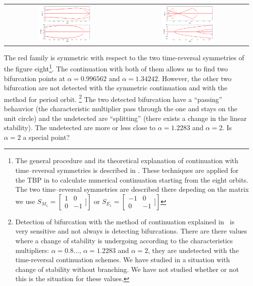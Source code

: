 \documentclass{article}
\begin{document}
\begin{tabular}{cc}
\includegraphics[width=0.45\textwidth]{cm_down.pdf}&
\includegraphics[width=0.45\textwidth]{cm_up.pdf}
\end{tabular}

The red family is symmetric with respect to the two time-reversal
symmetries of the figure eight\footnote{The general procedure and its
  theoretical explanation of
  continuation with time--reversal symmetries is described in
  \cite{CelMech}. These techniques are applied for the TBP in
  \cite{Zaragoza} to calculate numerical continuation starting from
  the eight orbits. The two time--reversal symmetries are described
  there depeding on the matrix we use $S_{M_1}=\left [
    \begin{array}{cc}
      1  & 0 \\
      0 & -1
    \end{array} ] \right ] $ or $S_{E_1}=\left [
    \begin{array}{cc}
      -1  & 0 \\
      0 & -1
    \end{array} ] \right ] $
}. The continuation 
with both of them allows us to find two bifurcation points at $\alpha= 0.996562$  and $\alpha= 1.34242$. However, the other two bifurcation 
are not detected with the symmetric continuation and with the method
for period orbit.
\footnote{Detection of bifurcation with the method of continuation
  explained in~\cite{PhysD} is very sensitive and not always is
  detecting bifurcations.  There are there values where a change of
  stability is undergoing according to the characteristics
  multipliers:
  $\alpha=0.8\dots$, $\alpha=1.2283$ and $\alpha=2$, they are
  undetected with the time-reversal continuation schemes. We have studied
  in \cite{Istambul} a situation with change of stability without
  branching. We have not studied whether or not this is the situation
  for these values.}
The two detected bifurcation have a 
``passing'' behauvior (the characteristic multiplier pass through the one and stays on the unit circle) and the undetected are ``splitting'' (there exists a
change in the linear stability). The undetected are more or less close to $\alpha=1.2283$ and $\alpha=2$. Is $\alpha=2$ a special point?
\end{document}
